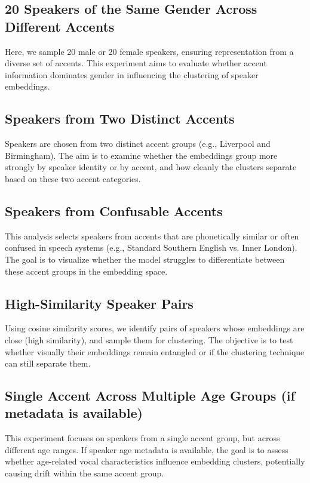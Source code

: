 \documentclass[conference]{IEEEtran}
\begin{document}
\subsection{20 Speakers of the Same Gender Across Different Accents}
Here, we sample 20 male or 20 female speakers, ensuring representation from a diverse set of accents. This experiment aims to evaluate whether accent information dominates gender in influencing the clustering of speaker embeddings.

\subsection{Speakers from Two Distinct Accents}
Speakers are chosen from two distinct accent groups (e.g., Liverpool and Birmingham). The aim is to examine whether the embeddings group more strongly by speaker identity or by accent, and how cleanly the clusters separate based on these two accent categories.

\subsection{Speakers from Confusable Accents}
This analysis selects speakers from accents that are phonetically similar or often confused in speech systems (e.g., Standard Southern English vs. Inner London). The goal is to visualize whether the model struggles to differentiate between these accent groups in the embedding space.

\subsection{High-Similarity Speaker Pairs}
Using cosine similarity scores, we identify pairs of speakers whose embeddings are close (high similarity), and sample them for clustering. The objective is to test whether visually their embeddings remain entangled or if the clustering technique can still separate them.

\subsection{Single Accent Across Multiple Age Groups (if metadata is available)}
This experiment focuses on speakers from a single accent group, but across different age ranges. If speaker age metadata is available, the goal is to assess whether age-related vocal characteristics influence embedding clusters, potentially causing drift within the same accent group.
\end{document}
